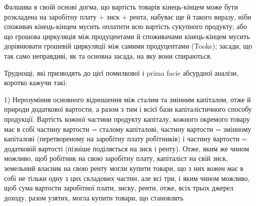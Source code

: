 Фалшива в своїй основі догма, що вартість товарів кінець-кінцем може
бути розкладена на заробітну плату + зиск + рента, набуває ще й такого виразу,
ніби споживач кінець-кінцем мусить оплатити всю вартість сукупного
продукту; або що грошова циркуляція між продуцентами й споживачами кінець-кінцем
мусить дорівнювати грошевій циркуляції між самими продуцентами
(Tooke); засади, що так само неправдиві, як та основна засада, на яку вони
спираються.

Труднощі, які призводять до цієї помилкової і prima facie абсурдної аналізи,
коротко кажучи такі:

1) Нерозуміння основного відношення між сталим та змінним капіталом,
отже й природи додаткової вартости, а разом з тим і всієї бази капіталістичного
способу продукції. Вартість кожної частини продукту капіталу, кожного
окремого товару має в собі частину вартости = сталому капіталові, частину
вартости = змінному капіталові (перетвореному на заробітну плату робітників)
і частину вартости = додатковій вартості (пізніше поділяється на зиск і ренту).
Отже, яким же чином можливо, щоб робітник на свою заробітну плату, капіталіст
на свій зиск, земельний власник на свою ренту могли купити товари, що
з них кожен має в собі не тільки одну з цих складових частин, але всі три, і
яким чином можливо, щоб сума вартости заробітної плати, зиску, ренти, отже,
всіх трьох джерел доходу, разом узятих, могла купити товари, що становлять
\parbreak{}  %
